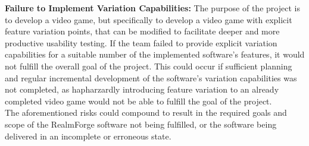 \documentclass{article}
\begin{document}
\noindent \textbf{Failure to Implement Variation Capabilities:} The purpose of 
the project is to develop a video game, but specifically to develop a video 
game with explicit feature variation points, that can be modified to facilitate 
deeper and more productive usability testing. If the team failed to provide 
explicit variation capabilities for a suitable number of the implemented 
software's features, it would not fulfill the overall goal of the project. This 
could occur if sufficient planning and regular incremental development of the 
software's variation capabilities was not completed, as hapharzardly 
introducing feature variation to an already completed video game would not be 
able to fulfill the goal of the project.
\\

\noindent The aforementioned risks could compound to result in the required 
goals and scope of the RealmForge software not being fulfilled, or the software 
being delivered in an incomplete or erroneous state.
\\
\end{document}
